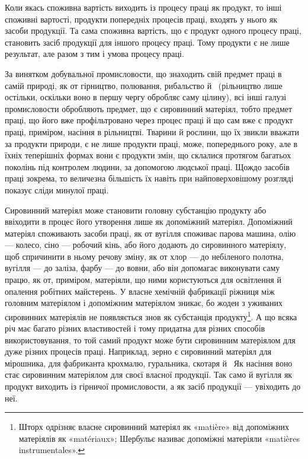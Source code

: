 Коли якась споживна вартість виходить із процесу праці як
продукт, то інші споживні вартості, продукти попередніх процесів
праці, входять у нього як засоби продукції. Та сама споживна
вартість, що є продукт одного процесу праці, становить засіб
продукції для іншого процесу праці. Тому продукти є не лише
результат, але разом з тим і умова процесу праці.

За винятком добувальної промисловости, що знаходить свій
предмет праці в самій природі, як от гірництво, полювання,
рибальство й~ (рільництво лише остільки, оскільки воно в
першу чергу обробляє саму цілину), всі інші галузі промисловости
обробляють предмет, що є сировинний матеріял, тобто предмет
праці, що його вже профільтровано через процес праці й що
сам вже є продукт праці, приміром, насіння в рільництві. Тварини
й рослини, що їх звикли вважати за продукти природи, є не
лише продукти праці, може, попереднього року, але в їхніх теперішніх
формах вони є продукти змін, що склалися протягом
багатьох поколінь під контролем людини, за допомогою людської
праці. Щождо засобів праці зокрема, то величезна більшість їх
навіть при найповерховішому розгляді показує сліди минулої
праці.

Сировинний матеріял може становити головну субстанцію
продукту або ввіходити в процес його утворення лише як допоміжний
матеріял. Допоміжний матеріял споживають засоби праці,
як от вугілля споживає парова машина, олію — колесо, сіно —
робочий кінь, або його додають до сировинного матеріялу, щоб
спричинити в ньому речову зміну, як от хлор — до небіленого
полотна, вугілля — до заліза, фарбу — до вовни, або він допомагає
виконувати саму працю, як от, приміром, матеріяли, що
ними користуються для освітлення й опалення робітних майстерень.
У власне хемічній фабрикації ріжниця між головним матеріялом
і допоміжним матеріялом зникає, бо жоден з уживаних
сировинних матеріялів не появляється знов як субстанція продукту\footnote{
Шторх одрізняє власне сировинний матеріял як «matière» від
допоміжних матеріялів як «matériaux»; Шербульє називає допоміжні
матеріяли «matières instrumentales».
}.
А що всяка річ має багато різних властивостей і тому придатна
для різних способів використовування, то той самий продукт
може бути сировинним матеріялом для дуже різних процесів
праці. Наприклад, зерно є сировинний матеріял для мірошника,
для фабриканта крохмалю, гуральника, скотаря й~ Як
насіння воно стає сировинним матеріялом для своєї власної продукції.
Так само й вугілля як продукт виходить із гірничої промисловости,
а як засіб продукції — увіходить до неї.

